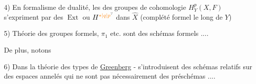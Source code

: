4) En formalisme de dualité, les  des groupes de cohomologie $H^p_Y(X,F)$ s'expriment par des $\operatorname{Ext}$ ou $H^{\unsure{*|q|p}}$ dans $\widehat X$ (complété formel le long de $Y$)

5) Théorie des groupes formels,  $\pi_1$ etc.  sont  des schémas formels ....

De plus, notons

6) Dans la théorie des types de \uline{Greenberg} - \uline{} s'introduisent des schémas relatifs sur des espaces annelés qui ne sont pas nécessairement des préschémas ....

